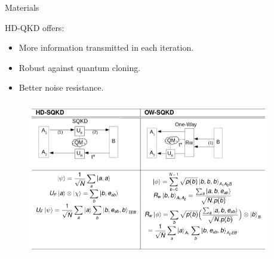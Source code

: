 \documentclass[final]{beamer}
\newlength{\onecolwid}
\newlength{\twocolwid}
\begin{document}
\begin{frame}[t]
\begin{columns}[t]
\begin{column}{\twocolwid}
\begin{columns}[t,totalwidth=\twocolwid]
\begin{column}{\onecolwid}\vspace{-.6in} %


\begin{block}{Materials}

HD-QKD offers:
\begin{itemize}
\item More information transmitted in each iteration. 
\item Robust against quantum cloning.
\item Better noise resistance. 
\end{itemize}


\begin{figure}
	\includegraphics[width=\linewidth]{proof_table.png}
\end{figure}


\end{block}


\end{column} %

\begin{column}{\onecolwid}\vspace{-.6in} %



\end{column}
\end{columns}
\end{column}
\end{columns}
\end{frame}
\end{document}
